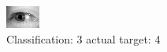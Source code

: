 \begin{figure}[h!]
\begin{center}
\includegraphics[width=0.60\columnwidth]{figures/ID3259_class_3_target_4.png}
\end{center}
\caption{ Classification: 3 actual target: 4}
\label{fig:ID3259_class_3_target_4}
\end{figure}
